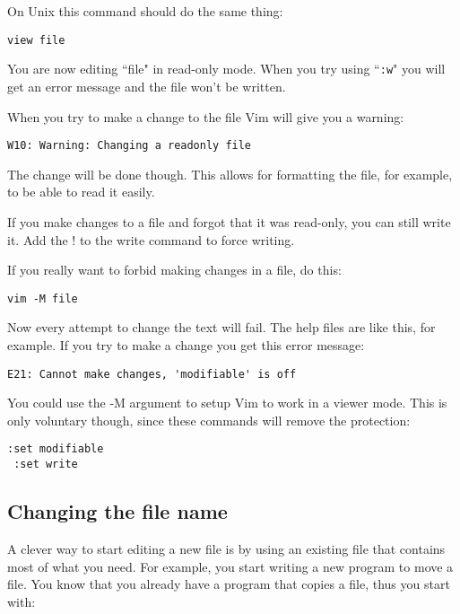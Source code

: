 On Unix this command should do the same thing:

 \begin{Verbatim}[samepage=true]
 view file
 \end{Verbatim}

You are now editing ``file" in read-only mode.
When you try using ``\texttt{:w}" you will get an error message and the file won't be written.

When you try to make a change to the file Vim will give you a warning:

\begin{Verbatim}[samepage=true]
    W10: Warning: Changing a readonly file 
\end{Verbatim}

The change will be done though.
This allows for formatting the file, for example, to be able to read it easily.

If you make changes to a file and forgot that it was read-only, you can still write it.
Add the ! to the write command to force writing.

If you really want to forbid making changes in a file, do this:

 \begin{Verbatim}[samepage=true]
 vim -M file
 \end{Verbatim}

Now every attempt to change the text will fail.
The help files are like this, for example.
If you try to make a change you get this error message:

\begin{Verbatim}[samepage=true]
    E21: Cannot make changes, 'modifiable' is off 
\end{Verbatim}

You could use the -M argument to setup Vim to work in a viewer mode.
This is only voluntary though, since these commands will remove the protection:

 \begin{Verbatim}[samepage=true]
 :set modifiable
 :set write
 \end{Verbatim}

\subsection{Changing the file name}
A clever way to start editing a new file is by using an existing file that contains most of what you need.
For example, you start writing a new program to move a file.
You know that you already have a program that copies a file, thus you start with:

